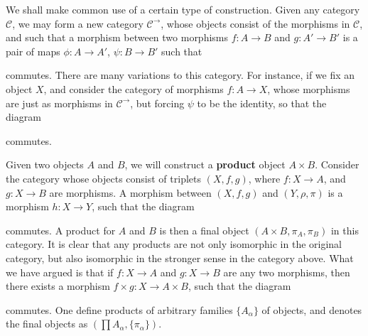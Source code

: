 We shall make common use of a certain type of construction. Given any category $\mathcal{C}$, we may form a new category $\mathcal{C}^\to$, whose objects consist of the morphisms in $\mathcal{C}$, and such that a morphism between two morphisms $f: A \to B$ and $g: A' \to B'$ is a pair of maps $\phi: A \to A'$, $\psi: B \to B'$ such that
%
\begin{center}
\end{center}
%
commutes. There are many variations to this category. For instance, if we fix an object $X$, and consider the category of morphisms $f:A \to X$, whose morphisms are just as morphisms in $\mathcal{C}^\to$, but forcing $\psi$ to be the identity, so that the diagram
%
\begin{center}
\end{center}
%
commutes.

Given two objects $A$ and $B$, we will construct a {\bf product} object $A \times B$. Consider the category whose objects consist of triplets $(X,f,g)$, where $f: X \to A$, and $g: X \to B$ are morphisms. A morphism between $(X, f,g)$ and $(Y, \rho, \pi)$ is a morphism $h: X \to Y$, such that the diagram
%
\begin{center}
\end{center}
%
commutes. A product for $A$ and $B$ is then a final object $(A \times B, \pi_A, \pi_B)$ in this category. It is clear that any products are not only isomorphic in the original category, but also isomorphic in the stronger sense in the category above. What we have argued is that if $f: X \to A$ and $g: X \to B$ are any two morphisms, then there exists a morphism $f \times g: X \to A \times B$, such that the diagram
%
\begin{center}
\end{center}
%
commutes. One define products of arbitrary families $\{ A_\alpha \}$ of objects, and denotes the final objects as $(\prod A_\alpha, \{ \pi_\alpha \})$.

